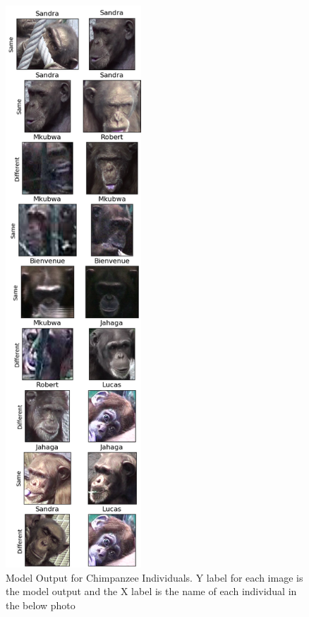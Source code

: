 \documentclass[11pt]{article}
\begin{document}
\begin{figure}
	\begin{center}
    \includegraphics[width=2.0in]{ChimpanzeeComparison.png}
  \caption{Model Output for Chimpanzee Individuals. Y label for each image is the model output and the X label is the name of each individual in the below photo}
  	\end{center}
\end{figure}
\end{document}
